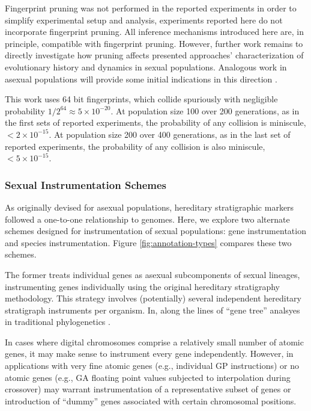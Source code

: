 Fingerprint pruning was not performed in the reported experiments in order to simplify experimental setup and analysis, experiments reported here do not incorporate fingerprint pruning.
All inference mechanisms introduced here are, in principle, compatible with fingerprint pruning.
However, further work remains to directly investigate how pruning affects presented approaches' characterization of evolutionary history and dynamics in sexual populations.
Analogous work in asexual populations will provide some initial indications in this direction \citep{moreno2023toward}.

This work uses 64 bit fingerprints, which collide spuriously with negligible probability $1/2^{64} \approx 5 \times 10^{-20}$.
At population size 100 over 200 generations, as in the first sets of reported experiments, the probability of any collision is miniscule, $< 2 \times 10^{-15}$.
At population size 200 over 400 generations, as in the last set of reported experiments, the probability of any collision is also miniscule, $< 5 \times 10^{-15}$.

\subsubsection{Sexual Instrumentation Schemes}



As originally devised for asexual populations, hereditary stratigraphic markers followed a one-to-one relationship to genomes.
Here, we explore two alternate schemes designed for instrumentation of sexual populations: gene instrumentation and species instrumentation.
Figure \ref{fig:annotation-types} compares these two schemes.

The former treats individual genes as asexual subcomponents of sexual lineages, instrumenting genes individually using the original hereditary stratigraphy methodology.
This strategy involves (potentially) several independent hereditary stratigraph instruments per organism.
In, along the lines of ``gene tree'' analsyes in traditional phylogenetics \citep{avise1989gene}.

In cases where digital chromosomes comprise a relatively small number of atomic genes, it may make sense to instrument every gene independently.
However, in applications with very fine atomic genes (e.g., individual GP instructions) or no atomic genes (e.g., GA floating point values subjected to interpolation during crossover) may warrant instrumentation of a representative subset of genes or introduction of ``dummy'' genes associated with certain chromosomal positions.


